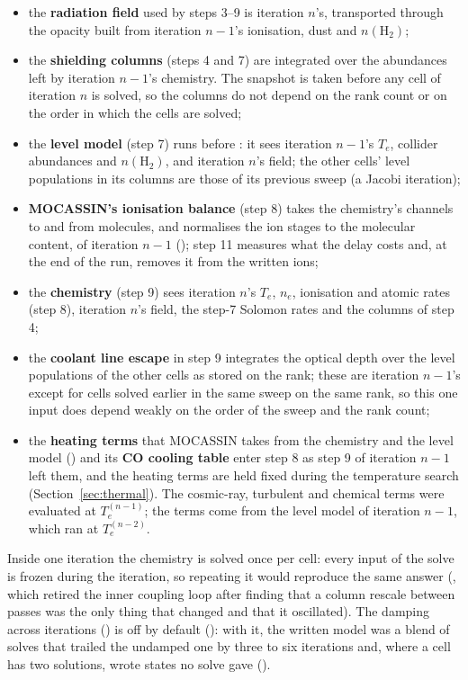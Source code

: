 \begin{itemize}
\item the \textbf{radiation field} used by steps 3--9 is iteration $n$'s,
  transported through the opacity built from iteration $n-1$'s ionisation,
  dust and $n(\mathrm{H_2})$;
\item the \textbf{shielding columns} (steps 4 and 7) are integrated over the
  abundances left by iteration $n-1$'s chemistry. The snapshot is taken
  before any cell of iteration $n$ is solved, so the columns do not depend
  on the rank count or on the order in which the cells are solved;
\item the \textbf{level model} (step 7) runs before : it sees
  iteration $n-1$'s $T_e$, collider abundances and $n(\mathrm{H_2})$, and
  iteration $n$'s field; the other cells' level populations in its columns
  are those of its previous sweep (a Jacobi iteration);
\item \textbf{MOCASSIN's ionisation balance} (step 8) takes the chemistry's
  channels to and from molecules, and normalises the ion stages to the
  molecular content, of iteration $n-1$ (); step 11 measures what
  the delay costs and, at the end of the run, removes it from the written
  ions;
\item the \textbf{chemistry} (step 9) sees iteration $n$'s $T_e$, $n_e$,
  ionisation and atomic rates (step 8), iteration $n$'s field, the step-7
  Solomon rates and the columns of step 4;
\item the \textbf{coolant line escape} in step 9 integrates the optical depth
  over the level populations of the other cells as stored on the rank; these
  are iteration $n-1$'s except for cells solved earlier in the same sweep on
  the same rank, so this one input does depend weakly on the order of the
  sweep and the rank count;
\item the \textbf{heating terms} that MOCASSIN takes from the chemistry and
  the level model () and its \textbf{CO cooling table} enter
  step 8 as step 9 of iteration $n-1$ left them, and the heating terms are
  held fixed during the temperature search (Section~\ref{sec:thermal}). The
  cosmic-ray, turbulent and chemical terms were evaluated at $T_e^{(n-1)}$; the
  \Htwo{} terms come from the level model of iteration $n-1$, which ran at
  $T_e^{(n-2)}$.
\end{itemize}

Inside one iteration the chemistry is solved once per cell: every input of
the solve is frozen during the iteration, so repeating it would reproduce the
same answer (, which retired the inner coupling loop after
finding that a column rescale between passes was the only thing that changed
and that it oscillated). The damping across iterations () is off
by default (): with it, the written model was a blend of solves
that trailed the undamped one by three to six iterations and, where a cell
has two solutions, wrote states no solve gave ().

